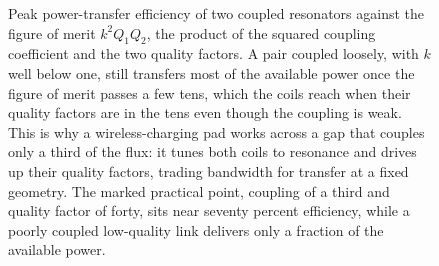 \begin{figure}[htbp]
\centering
{}
\caption[Transfer efficiency of a loosely coupled resonant link]{Peak
power-transfer efficiency of two coupled resonators against the figure of
merit $k^2 Q_1 Q_2$, the product of the squared coupling coefficient and
the two quality factors. A pair coupled loosely, with $k$ well below one,
still transfers most of the available power once the figure of merit passes
a few tens, which the coils reach when their quality factors are in the
tens even though the coupling is weak. This is why a wireless-charging pad
works across a gap that couples only a third of the flux: it tunes both
coils to resonance and drives up their quality factors, trading bandwidth
for transfer at a fixed geometry. The marked practical point, coupling of a
third and quality factor of forty, sits near seventy percent efficiency,
while a poorly coupled low-quality link delivers only a fraction of the
available power.}
\label{fig:vol04ch08:resonant-transfer}
\end{figure}
